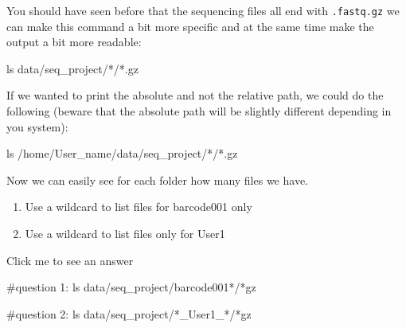 \documentclass[
  letterpaper,
  DIV=11,
  numbers=noendperiod]{scrreprt}
\newenvironment{Shaded}{}{}
\newcommand{\CommentTok}[1]{\textcolor[rgb]{0.42,0.45,0.49}{#1}}
\newcommand{\FunctionTok}[1]{\textcolor[rgb]{0.44,0.26,0.76}{#1}}
\newcommand{\NormalTok}[1]{\textcolor[rgb]{0.14,0.16,0.18}{#1}}
\newcommand{\PreprocessorTok}[1]{\textcolor[rgb]{0.84,0.23,0.29}{#1}}
\providecommand{\tightlist}{%
  \setlength{\itemsep}{0pt}\setlength{\parskip}{0pt}}\usepackage{longtable,booktabs,array}
\begin{document}
You should have seen before that the sequencing files all end with
\texttt{.fastq.gz} we can make this command a bit more specific and at
the same time make the output a bit more readable:

\begin{Shaded}
\begin{Highlighting}[]
\FunctionTok{ls}\NormalTok{ data/seq\_project/}\PreprocessorTok{*}\NormalTok{/}\PreprocessorTok{*}\NormalTok{.gz}
\end{Highlighting}
\end{Shaded}

If we wanted to print the absolute and not the relative path, we could
do the following (beware that the absolute path will be slightly
different depending in you system):

\begin{Shaded}
\begin{Highlighting}[]
\FunctionTok{ls}\NormalTok{ /home/User\_name/data/seq\_project/}\PreprocessorTok{*}\NormalTok{/}\PreprocessorTok{*}\NormalTok{.gz}
\end{Highlighting}
\end{Shaded}

Now we can easily see for each folder how many files we have.

\begin{tcolorbox}[enhanced jigsaw, breakable, left=2mm, opacitybacktitle=0.6, coltitle=black, toprule=.15mm, colframe=quarto-callout-caution-color-frame, opacityback=0, bottomtitle=1mm, rightrule=.15mm, colback=white, toptitle=1mm, leftrule=.75mm, titlerule=0mm, bottomrule=.15mm, title=\textcolor{quarto-callout-caution-color}{\faFire}\hspace{0.5em}{Exercise}, colbacktitle=quarto-callout-caution-color!10!white, arc=.35mm]

\begin{enumerate}
\def\labelenumi{\arabic{enumi}.}
\tightlist
\item
  Use a wildcard to list files for barcode001 only
\item
  Use a wildcard to list files only for User1
\end{enumerate}

Click me to see an answer

\begin{Shaded}
\begin{Highlighting}[]
\CommentTok{\#question 1:}
\FunctionTok{ls}\NormalTok{ data/seq\_project/barcode001}\PreprocessorTok{*}\NormalTok{/}\PreprocessorTok{*}\NormalTok{gz}

\CommentTok{\#question 2:}
\FunctionTok{ls}\NormalTok{ data/seq\_project/}\PreprocessorTok{*}\NormalTok{\_User1\_}\PreprocessorTok{*}\NormalTok{/}\PreprocessorTok{*}\NormalTok{gz}
\end{Highlighting}
\end{Shaded}

\end{tcolorbox}
\end{document}
